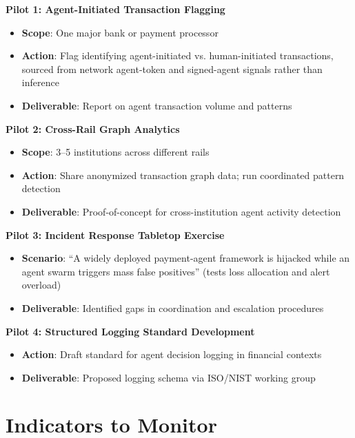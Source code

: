 \documentclass[11pt,letterpaper]{article}
\begin{document}
\begin{keybox}
\textbf{Pilot 1: Agent-Initiated Transaction Flagging}
\begin{itemize}
  \item \textbf{Scope}: One major bank or payment processor
  \item \textbf{Action}: Flag identifying agent-initiated vs. human-initiated transactions, sourced from network agent-token and signed-agent signals rather than inference
  \item \textbf{Deliverable}: Report on agent transaction volume and patterns
\end{itemize}

\textbf{Pilot 2: Cross-Rail Graph Analytics}
\begin{itemize}
  \item \textbf{Scope}: 3--5 institutions across different rails
  \item \textbf{Action}: Share anonymized transaction graph data; run coordinated pattern detection
  \item \textbf{Deliverable}: Proof-of-concept for cross-institution agent activity detection
\end{itemize}

\textbf{Pilot 3: Incident Response Tabletop Exercise}
\begin{itemize}
  \item \textbf{Scenario}: ``A widely deployed payment-agent framework is hijacked while an agent swarm triggers mass false positives'' (tests loss allocation and alert overload)
  \item \textbf{Deliverable}: Identified gaps in coordination and escalation procedures
\end{itemize}

\textbf{Pilot 4: Structured Logging Standard Development}
\begin{itemize}
  \item \textbf{Action}: Draft standard for agent decision logging in financial contexts
  \item \textbf{Deliverable}: Proposed logging schema via ISO/NIST working group
\end{itemize}
\end{keybox}

\section{Indicators to Monitor}
\end{document}
